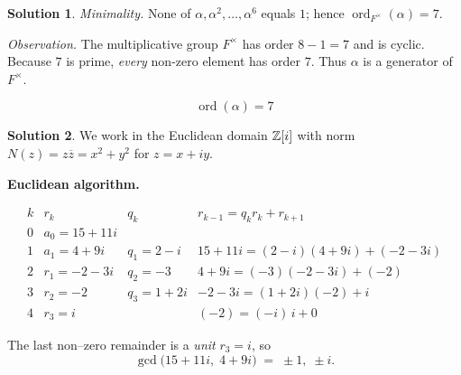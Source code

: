 \documentclass[12pt]{article}
\theoremstyle{definition} %
\newtheorem{solution}{Solution}
\theoremstyle{plain} %
\begin{document}
\begin{solution}
                    \emph{Minimality.}  
                    None of \(\alpha,\alpha^{2},\dots,\alpha^{6}\) equals \(1\); hence
                    \(\operatorname{ord}_{F^{\times}}(\alpha)=7\).
                    
                    \smallskip
                    \emph{Observation.}  
                    The multiplicative group \(F^{\times}\) has order \(8-1=7\) and is
                    cyclic. Because \(7\) is prime, \emph{every} non-zero element has order
                    \(7\).  Thus \(\alpha\) is a generator of \(F^{\times}\).
                    
                    \[
                    \boxed{\;\operatorname{ord}(\alpha)=7\;}
                    \]
                    \end{solution}
                    \begin{solution}
                      We work in the Euclidean domain $\Bbb Z[i]$ with norm
                      $N(z)=z\overline z=x^{2}+y^{2}$ for $z=x+iy$.
                      
                      \bigskip
                      \textbf{Euclidean algorithm.}
                      
                      \[
                      \renewcommand{\arraystretch}{1.2}
                      \begin{array}{r|c|c|c}
                      k & r_{k} & q_{k} & r_{k-1}=q_{k}r_{k}+r_{k+1}\\\hline
                      0 & a_{0}=15+11i &      & \\[2pt]
                      1 & a_{1}=4+9i   & q_{1}=2-i
                            & 15+11i=(2-i)(4+9i)+\boxed{(-2-3i)}\\[4pt]
                      2 & r_{1}=-2-3i  & q_{2}=-3
                            & 4+9i=(-3)(-2-3i)+\boxed{(-2)}\\[4pt]
                      3 & r_{2}=-2     & q_{3}=1+2i
                            & -2-3i=(1+2i)(-2)+\boxed{i}\\[4pt]
                      4 & r_{3}=i      &           & (-2)=(-i)\,i+0
                      \end{array}
                      \]
                      
                      The last non–zero remainder is a \emph{unit} $r_{3}=i$, so
                      \[
                      \gcd\bigl(15+11i,\;4+9i\bigr)\;=\;\pm1,\;\pm i.
                      \]
                      

\end{solution}
\end{document}
